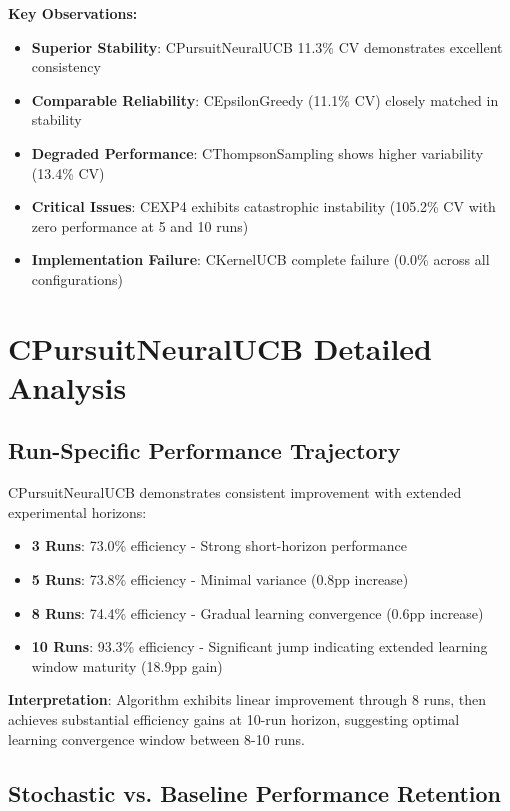 \documentclass[12pt,a4paper]{article}
\newcommand{\primarytext}[1]{\textcolor{primaryblue}{\textbf{#1}}}
\newcommand{\secondarytext}[1]{\textcolor{secondaryblue}{\textbf{#1}}}
\newcommand{\success}[1]{\textcolor{accentgreen}{\textbf{#1}}}
\newcommand{\warning}[1]{\textcolor{warningred}{\textbf{#1}}}
\begin{document}
\textbf{Key Observations:}
\begin{itemize}
\item \primarytext{Superior Stability}: CPursuitNeuralUCB 11.3\% CV demonstrates excellent consistency
\item \secondarytext{Comparable Reliability}: CEpsilonGreedy (11.1\% CV) closely matched in stability
\item \warning{Degraded Performance}: CThompsonSampling shows higher variability (13.4\% CV)
\item \warning{Critical Issues}: CEXP4 exhibits catastrophic instability (105.2\% CV with zero performance at 5 and 10 runs)
\item \warning{Implementation Failure}: CKernelUCB complete failure (0.0\% across all configurations)
\end{itemize}

\section{CPursuitNeuralUCB Detailed Analysis}

\subsection{Run-Specific Performance Trajectory}

CPursuitNeuralUCB demonstrates consistent improvement with extended experimental horizons:

\begin{itemize}
\item \primarytext{3 Runs}: 73.0\% efficiency - Strong short-horizon performance
\item \primarytext{5 Runs}: 73.8\% efficiency - Minimal variance (0.8pp increase)
\item \primarytext{8 Runs}: 74.4\% efficiency - Gradual learning convergence (0.6pp increase)
\item \success{10 Runs}: 93.3\% efficiency - Significant jump indicating extended learning window maturity (18.9pp gain)
\end{itemize}

\textbf{Interpretation}: Algorithm exhibits linear improvement through 8 runs, then achieves substantial efficiency gains at 10-run horizon, suggesting optimal learning convergence window between 8-10 runs.

\subsection{Stochastic vs. Baseline Performance Retention}
\end{document}
